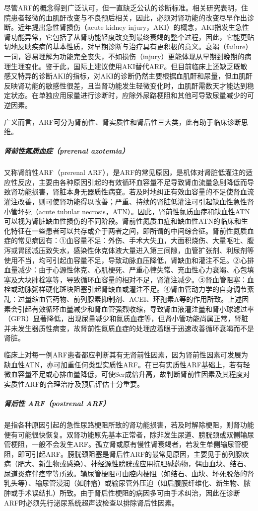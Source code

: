 尽管ARF的概念得到广泛认可，但一直缺乏公认的诊断标准。相关研究表明，住院患者轻微的血肌酐改变与不良预后相关，因此，必须对肾功能的改变尽早作出诊断。近年提出急性肾损伤（acute
kidney
injury，AKI）的概念，AKI指发生急性肾功能异常，它包括了从肾功能轻度改变到最终衰竭的整个过程，因此，它能更贴切地反映疾病的基本性质，对早期诊断与治疗具有更积极的意义。衰竭（failure）一词，容易理解为功能完全丧失，不如损伤（injury）更能体现从早期到晚期的病理生理变化。鉴于此，国际上建议使用AKI替代ARF。但目前临床上还缺乏既敏感又特异的诊断AKI的指标，对AKI的诊断仍然主要根据血肌酐和尿量，但血肌酐反映肾功能的敏感性很差，且当肾功能发生轻微变化时，血肌酐需数天才能达到稳定状态。在单独应用尿量进行诊断时，应除外尿路梗阻和其他可导致尿量减少的可逆因素。

广义而言，ARF可分为肾前性、肾实质性和肾后性三大类，此有助于临床诊断思维。

\subparagraph{肾前性氮质血症（prerenal azotemia）}

又称肾前性ARF（prerenal
ARF），是ARF的常见原因，是机体对肾脏低灌注的适应性反应，主要由各种原因引起的有效循环血容量不足导致肾血流量急剧降低而导致肾功能损害，肾脏本身无器质性病变。若及时地纠正有效血容量的不足使肾血流灌注改善，则可使肾功能得以改善；严重、持续的肾脏低灌注可引起缺血性急性肾小管坏死（acute
tubular
necrosis，ATN）。因此，肾前性氮质血症和缺血性ATN可以视为肾脏缺血性损伤的不同阶段。肾前性氮质血症和缺血性ATN的临床和生化特征在一些患者可以共存或介于两者之间，即所谓的中间综合征。肾前性氮质血症的常见病因有：①血容量不足：外伤、手术大失血，大面积烧伤、大量呕吐、腹泻或胃肠减压致失水，感染性休克体液大量进入第三间隙，血管扩张剂、利尿剂等使用不当，均可引起血容量不足，导致动脉血压降低，肾缺血和灌注不足。②心排血量减少：由于心源性休克、心肌梗死、严重心律失常、充血性心力衰竭、心包填塞及大块肺栓塞等，导致循环血容量的相对不足，肾灌注减少。③肾血管阻塞：血栓或动脉粥样硬化斑块阻塞引起肾缺血或灌注不足。④肾血管动力学的自身调节紊乱：过量缩血管药物、前列腺素抑制剂、ACEI、环孢素A等的作用所致。上述因素会引起有效循环血量减少和肾血管强烈收缩，导致肾血液灌注量和肾小球滤过率（GFR）显著降低，出现尿量减少和氮质血症等，但肾小管功能尚属正常，肾脏并未发生器质性病变，故肾前性氮质血症的处理应着眼于迅速改善循环衰竭而不是肾脏。

临床上对每一例ARF患者都应判断其有无肾前性因素，因为肾前性因素可发展为缺血性ATN，亦可加重任何类型实质性ARF。在已有实质性ARF基础上，若有轻微血容量不足或心排血量降低，可使Scr成倍升高，故判断肾前性因素及其程度对实质性ARF的合理治疗及预后评估十分重要。

\subparagraph{肾后性 ARF（postrenal ARF）}

是指各种原因引起的急性尿路梗阻所致的肾功能损害，若及时解除梗阻，则肾功能便有可能很快恢复。双肾功能原先基本正常者，除非发生尿道、膀胱颈或双侧输尿管梗阻，一般不会发生ARF。孤立肾或原有慢性肾衰竭者，若发生单侧输尿管梗阻，即可引起ARF。膀胱颈阻塞是肾后性ARF的最常见原因，主要见于前列腺疾病（肥大、新生物或感染）、神经源性膀胱或应用抗胆碱药物，偶由血块、结石、尿道炎症伴痉挛等所致。输尿管梗阻可由腔内梗阻（如结石、血块、坏死脱落的肾乳头等）、输尿管浸润（如肿瘤）或输尿管外压迫（如后腹膜纤维化、新生物、脓肿或手术误结扎）所致。由于肾后性梗阻的病因多可由手术纠治，因此在诊断ARF时必须先行泌尿系统超声波检查以排除肾后性因素。


